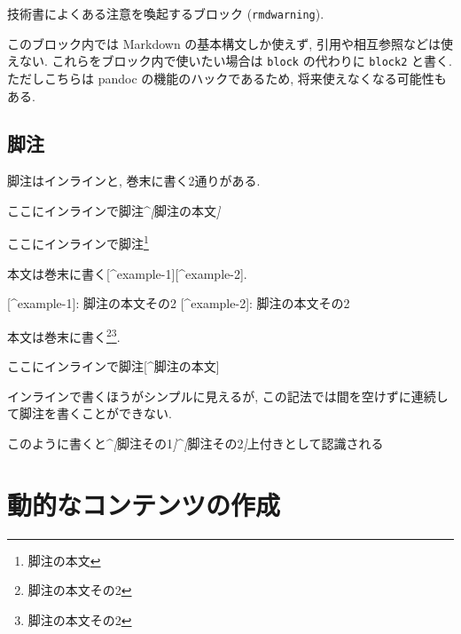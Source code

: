 \documentclass[
  nomag]{bxjsbook}
\makeatletter
\newenvironment{Shaded}{\begin{snugshade}}{\end{snugshade}}
\newcommand{\CommentTok}[1]{\textcolor[rgb]{0.56,0.35,0.01}{\textit{#1}}}
\newcommand{\NormalTok}[1]{#1}
\newcommand{\OtherTok}[1]{\textcolor[rgb]{0.56,0.35,0.01}{#1}}
\newenvironment{kframe}{%
\medskip{}
\setlength{\fboxsep}{.8em}
 \def\at@end@of@kframe{}%
 \ifinner\ifhmode%
  \def\at@end@of@kframe{\end{minipage}}%
  \begin{minipage}{\columnwidth}%
 \fi\fi%
 \def\FrameCommand##1{\hskip\@totalleftmargin \hskip-\fboxsep
 \colorbox{shadecolor}{##1}\hskip-\fboxsep
     \hskip-\linewidth \hskip-\@totalleftmargin \hskip\columnwidth}%
 \MakeFramed {\advance\hsize-\width
   \@totalleftmargin\z@ \linewidth\hsize
   \@setminipage}}%
 {\par\unskip\endMakeFramed%
 \at@end@of@kframe}
\newenvironment{rmdblock}[1]
  {
  \begin{itemize}
  \renewcommand{\labelitemi}{
    \raisebox{-.7\height}[0pt][0pt]{
      {\setkeys{Gin}{width=3em,keepaspectratio}\texttt{[image: \_latex/\_img/\#1]}}
    }
  }
  \setlength{\fboxsep}{1em}
  \begin{kframe}
  \item
  }
  {
  \end{kframe}
  \end{itemize}
  }
\newenvironment{rmdwarning}
  {\begin{rmdblock}{warning}}
  {\end{rmdblock}}
\theoremstyle{definition}
\theoremstyle{definition}
\theoremstyle{definition}
\theoremstyle{remark}
\makeatother
\begin{document}
\begin{rmdwarning}
技術書によくある注意を喚起するブロック (\texttt{rmdwarning}).
\end{rmdwarning}

このブロック内では Markdown の基本構文しか使えず,
引用や相互参照などは使えない. これらをブロック内で使いたい場合は
\texttt{block} の代わりに \texttt{block2} と書く. ただしこちらは pandoc
の機能のハックであるため, 将来使えなくなる可能性もある.

\hypertarget{ux811aux6ce8}{%
\section{脚注}\label{ux811aux6ce8}}

脚注はインラインと, 巻末に書く2通りがある.

\begin{Shaded}
\begin{Highlighting}[]
\NormalTok{ここにインラインで脚注\^{}}\CommentTok{[}\OtherTok{脚注の本文}\CommentTok{]}
\end{Highlighting}
\end{Shaded}

ここにインラインで脚注\footnote{脚注の本文}

\begin{Shaded}
\begin{Highlighting}[]
\NormalTok{本文は巻末に書く}\OtherTok{[\^{}example{-}1][\^{}example{-}2]}\NormalTok{.}

\OtherTok{[\^{}example{-}1]: }\NormalTok{脚注の本文その2}
\OtherTok{[\^{}example{-}2]: }\NormalTok{脚注の本文その2}
\end{Highlighting}
\end{Shaded}

本文は巻末に書く\footnote{脚注の本文その2}\footnote{脚注の本文その2}.

ここにインラインで脚注{[}\^{}脚注の本文{]}

インラインで書くほうがシンプルに見えるが,
この記法では間を空けずに連続して脚注を書くことができない.

\begin{Shaded}
\begin{Highlighting}[]
\NormalTok{このように書くと\^{}}\CommentTok{[}\OtherTok{脚注その1}\CommentTok{]}\NormalTok{\^{}}\CommentTok{[}\OtherTok{脚注その2}\CommentTok{]}\NormalTok{上付きとして認識される}
\end{Highlighting}
\end{Shaded}

\hypertarget{ux52d5ux7684ux306aux30b3ux30f3ux30c6ux30f3ux30c4ux306eux4f5cux6210}{%
\chapter{動的なコンテンツの作成}\label{ux52d5ux7684ux306aux30b3ux30f3ux30c6ux30f3ux30c4ux306eux4f5cux6210}}
\end{document}
